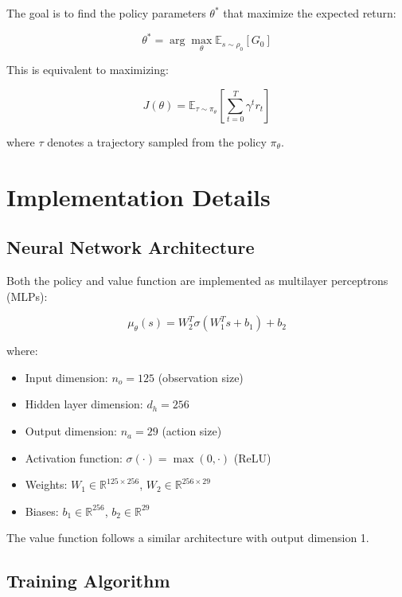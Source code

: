 \documentclass[12pt,a4paper]{article}
\begin{document}
\begin{itemize}
\begin{itemize}
The goal is to find the policy parameters $\theta^*$ that maximize the expected return:

\begin{equation}
\theta^* = \arg\max_\theta \mathbb{E}_{s \sim \rho_0} \left[ G_0 \right]
\end{equation}

This is equivalent to maximizing:

\begin{equation}
J(\theta) = \mathbb{E}_{\tau \sim \pi_\theta} \left[ \sum_{t=0}^{T} \gamma^t r_t \right]
\end{equation}

where $\tau$ denotes a trajectory sampled from the policy $\pi_\theta$.

\section{Implementation Details}

\subsection{Neural Network Architecture}

Both the policy and value function are implemented as multilayer perceptrons (MLPs):

\begin{equation}
\mu_\theta(s) = W_2^T \sigma(W_1^T s + b_1) + b_2
\end{equation}

where:
\begin{itemize}
\item Input dimension: $n_o = 125$ (observation size)
\item Hidden layer dimension: $d_h = 256$
\item Output dimension: $n_a = 29$ (action size)
\item Activation function: $\sigma(\cdot) = \max(0, \cdot)$ (ReLU)
\item Weights: $W_1 \in \mathbb{R}^{125 \times 256}$, $W_2 \in \mathbb{R}^{256 \times 29}$
\item Biases: $b_1 \in \mathbb{R}^{256}$, $b_2 \in \mathbb{R}^{29}$
\end{itemize}

The value function follows a similar architecture with output dimension 1.

\subsection{Training Algorithm}


\end{itemize}
\end{itemize}
\end{document}
